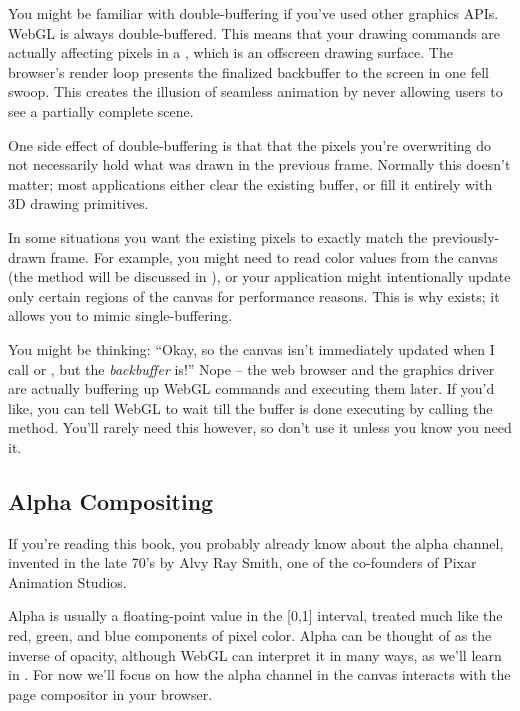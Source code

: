 You might be familiar with  double-buffering if you've used other graphics APIs.  WebGL is always double-buffered.  This means that your drawing commands are actually affecting pixels in a  , which is an offscreen drawing surface.  The browser's render loop presents the finalized backbuffer to the screen in one fell swoop.  This creates the illusion of seamless animation by never allowing users to see a partially complete scene.

One side effect of double-buffering is that that the pixels you're overwriting do not necessarily hold what was drawn in the previous frame.  Normally this doesn't matter; most applications either clear the existing buffer, or fill it entirely with 3D drawing primitives.

In some situations you want the existing pixels to exactly match the previously-drawn frame.  For example, you might need to read color values from the canvas (the   method will be discussed in ), or your application might intentionally update only certain regions of the canvas for performance reasons.  This is why  exists; it allows you to mimic  single-buffering.

You might be thinking: ``Okay, so the canvas isn't immediately updated when I call  or , but the \emph{backbuffer} is!''  Nope -- the web browser and the graphics driver are actually buffering up WebGL commands and executing them later.  If you'd like, you can tell WebGL to wait till the buffer is done executing by calling the   method.  You'll rarely need this however, so don't use it unless you know you need it.

\subsection{Alpha Compositing}

If you're reading this book, you probably already know about the alpha channel, invented in the late 70's by Alvy Ray Smith, one of the co-founders of Pixar Animation Studios.

Alpha is usually a floating-point value in the [0,1] interval, treated much like the red, green, and blue components of pixel color.  Alpha can be thought of as the inverse of opacity, although WebGL can interpret it in many ways, as we'll learn in .  For now we'll focus on how the alpha channel in the canvas interacts with the page compositor in your browser.

